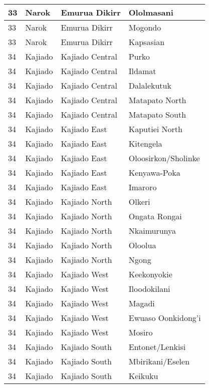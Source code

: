 \begin{table}[!ht]
\begin{tabular}{|l|l|l|l|}
        33 & Narok & Emurua Dikirr & Ololmasani \\ \hline
        33 & Narok & Emurua Dikirr & Mogondo \\ \hline
        33 & Narok & Emurua Dikirr & Kapsasian \\ \hline
        34 & Kajiado & Kajiado Central & Purko \\ \hline
        34 & Kajiado & Kajiado Central & Ildamat \\ \hline
        34 & Kajiado & Kajiado Central & Dalalekutuk \\ \hline
        34 & Kajiado & Kajiado Central & Matapato North \\ \hline
        34 & Kajiado & Kajiado Central & Matapato South \\ \hline
        34 & Kajiado & Kajiado East & Kaputiei North \\ \hline
        34 & Kajiado & Kajiado East & Kitengela \\ \hline
        34 & Kajiado & Kajiado East & Oloosirkon/Sholinke \\ \hline
        34 & Kajiado & Kajiado East & Kenyawa-Poka \\ \hline
        34 & Kajiado & Kajiado East & Imaroro \\ \hline
        34 & Kajiado & Kajiado North & Olkeri \\ \hline
        34 & Kajiado & Kajiado North & Ongata Rongai \\ \hline
        34 & Kajiado & Kajiado North & Nkaimurunya \\ \hline
        34 & Kajiado & Kajiado North & Oloolua \\ \hline
        34 & Kajiado & Kajiado North & Ngong \\ \hline
        34 & Kajiado & Kajiado West &   Keekonyokie \\ \hline
        34 & Kajiado & Kajiado West & Iloodokilani \\ \hline
        34 & Kajiado & Kajiado West & Magadi \\ \hline
        34 & Kajiado & Kajiado West & Ewuaso Oonkidong’i \\ \hline
        34 & Kajiado & Kajiado West & Mosiro \\ \hline
        34 & Kajiado & Kajiado South & Entonet/Lenkisi \\ \hline
        34 & Kajiado & Kajiado South & Mbirikani/Eselen \\ \hline
        34 & Kajiado & Kajiado South & Keikuku \\ \hline

\end{tabular}
\end{table}
